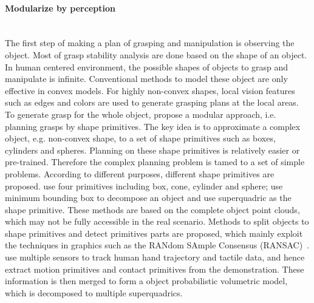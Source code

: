 \paragraph{Modularize by perception}
~\\
The first step of making a plan of grasping and manipulation is observing the object. Most of grasp stability analysis are done based on the shape of an object. In human centered environment, the possible shapes of objects to grasp and manipulate is infinite. Conventional methods to model these object are only effective in convex models. For highly non-convex shapes, local vision features such as edges and colors are used to generate grasping plans at the local areas. To generate grasp for the whole object, \citet{miller2003automatic} propose a modular approach, i.e. planning grasps by shape primitives. The key idea is to approximate a complex object, e.g. non-convex shape, to a set of shape primitives such as boxes, cylinders and spheres. Planning on these shape primitives is relatively easier or pre-trained. Therefore the complex planning problem is tamed to a set of simple problems. According to different purposes, different shape primitives are proposed. \citet{miller2003automatic} use four primitives including box, cone, cylinder and sphere; \citet{huebner2008minimum} use minimum bounding box to decompose an object and \citet{el2010new} use superquadric as the shape primitive. These methods are based on the complete object point clouds, which may not be fully accessible in the real scenario. Methods to split objects to shape primitives and detect primitives parts are proposed, which mainly exploit the techniques in graphics such as the RANdom SAmple Consensus (RANSAC)~\citep{garcia2009fitting,gallardo2011detection}.
\citet{faria2012extracting} use multiple sensors to track human hand trajectory and tactile data, and hence extract motion primitives and contact primitives from the demonstration. These information is then merged to form a object probabilistic volumetric model, which is decomposed to multiple superquadrics.

